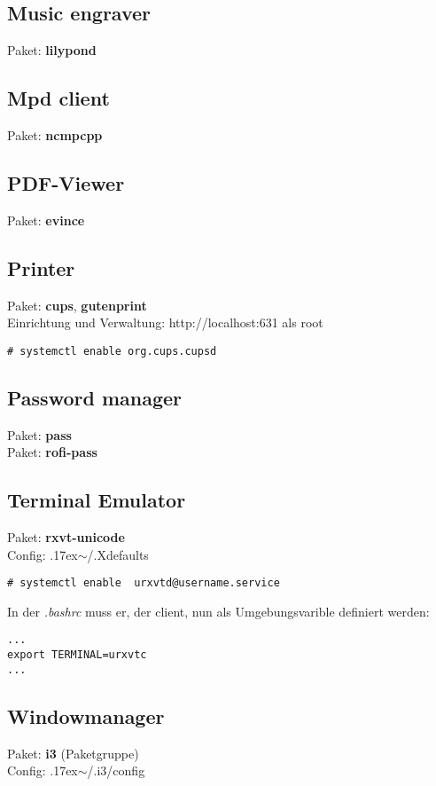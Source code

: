 \subsection{Music engraver}
Paket: \textbf{lilypond}

\subsection{Mpd client}
Paket: \textbf{ncmpcpp} 

\subsection{PDF-Viewer}
Paket: \textbf{evince} 

\subsection{Printer}
Paket: \textbf{cups}, \textbf{gutenprint}\\
Einrichtung und Verwaltung: http://localhost:631 als root \\
\begin{lstlisting}[style=Bash]
# systemctl enable org.cups.cupsd 
\end{lstlisting}

\subsection{Password manager}
Paket: \textbf{pass} \\ 
Paket: \textbf{rofi-pass}

\subsection{Terminal Emulator}
Paket: \textbf{rxvt-unicode} \\ 
Config: {{\raise.17ex\hbox{$\scriptstyle\mathtt{\sim}$}}/.Xdefaults} \\
\begin{lstlisting}[style=Bash]
# systemctl enable  urxvtd@username.service
\end{lstlisting}
In der \emph{.bashrc} muss er, der client, nun als Umgebungsvarible definiert werden:
\begin{lstlisting}[style=Bash]
...
export TERMINAL=urxvtc
...
\end{lstlisting}

\subsection{Windowmanager}
Paket: \textbf{i3} (Paketgruppe) \\ 
Config: {{\raise.17ex\hbox{$\scriptstyle\mathtt{\sim}$}}/.i3/config} \\

